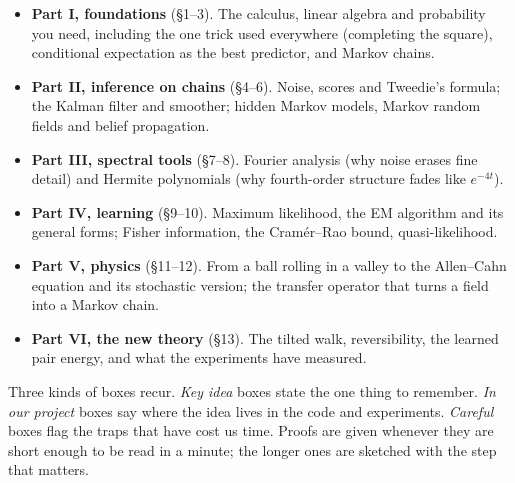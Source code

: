 \documentclass[10pt,a4paper]{article}
\theoremstyle{plain}
\theoremstyle{definition}
\begin{document}
\begin{itemize}
\item \textbf{Part I, foundations} (\S1--3). The calculus, linear algebra and probability you need,
  including the one trick used everywhere (completing the square), conditional expectation as the
  best predictor, and Markov chains.
\item \textbf{Part II, inference on chains} (\S4--6). Noise, scores and Tweedie's formula; the Kalman
  filter and smoother; hidden Markov models, Markov random fields and belief propagation.
\item \textbf{Part III, spectral tools} (\S7--8). Fourier analysis (why noise erases fine detail) and
  Hermite polynomials (why fourth-order structure fades like $e^{-4t}$).
\item \textbf{Part IV, learning} (\S9--10). Maximum likelihood, the EM algorithm and its general forms;
  Fisher information, the Cram\'er--Rao bound, quasi-likelihood.
\item \textbf{Part V, physics} (\S11--12). From a ball rolling in a valley to the Allen--Cahn equation
  and its stochastic version; the transfer operator that turns a field into a Markov chain.
\item \textbf{Part VI, the new theory} (\S13). The tilted walk, reversibility, the learned pair energy,
  and what the experiments have measured.
\end{itemize}

Three kinds of boxes recur. \emph{Key idea} boxes state the one thing to remember. \emph{In our
project} boxes say where the idea lives in the code and experiments. \emph{Careful} boxes flag the
traps that have cost us time. Proofs are given whenever they are short enough to be read in a
minute; the longer ones are sketched with the step that matters.

\tableofcontents
\clearpage







\end{document}
